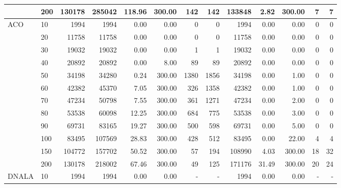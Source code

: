 \documentclass[12pt]{article}
\begin{document}
\begin{table}
{\begin{tabular}{llr|rrrrr|rrrrr}
   & 200 &   130178 &   285042 & 118.96 & 300.00 &        142 &                142 &   133848 &  2.82 & 300.00 &          7 &                  7 \\
   \midrule
ACO & 10  &     1994 &     1994 &   0.00 &   0.00 &          0 &                  0 &     1994 &  0.00 &   0.00 &          0 &                  0 \\
   & 20  &    11758 &    11758 &   0.00 &   0.00 &          0 &                  0 &    11758 &  0.00 &   0.00 &          0 &                  0 \\
   & 30  &    19032 &    19032 &   0.00 &   0.00 &          1 &                  1 &    19032 &  0.00 &   0.00 &          0 &                  0 \\
   & 40  &    20892 &    20892 &   0.00 &   8.00 &         89 &                 89 &    20892 &  0.00 &   0.00 &          0 &                  0 \\
   & 50  &    34198 &    34280 &   0.24 & 300.00 &       1380 &               1856 &    34198 &  0.00 &   1.00 &          0 &                  0 \\
   & 60  &    42382 &    45370 &   7.05 & 300.00 &        326 &               1358 &    42382 &  0.00 &   1.00 &          0 &                  0 \\
   & 70  &    47234 &    50798 &   7.55 & 300.00 &        361 &               1271 &    47234 &  0.00 &   2.00 &          0 &                  0 \\
   & 80  &    53538 &    60098 &  12.25 & 300.00 &        684 &                775 &    53538 &  0.00 &   3.00 &          0 &                  0 \\
   & 90  &    69731 &    83165 &  19.27 & 300.00 &        500 &                598 &    69731 &  0.00 &   5.00 &          0 &                  0 \\
   & 100 &    83495 &   107569 &  28.83 & 300.00 &        428 &                512 &    83495 &  0.00 &  22.00 &          4 &                  4 \\
   & 150 &   104772 &   157702 &  50.52 & 300.00 &         57 &                194 &   108990 &  4.03 & 300.00 &         18 &                 32 \\
   & 200 &   130178 &   218002 &  67.46 & 300.00 &         49 &                125 &   171176 & 31.49 & 300.00 &         20 &                 24 \\
   \midrule
DNALA & 10  &     1994 &     1994 &   0.00 &   0.00 &          - &                  - &     1994 &  0.00 &   0.00 &          - &                  - \\

\end{tabular}}
\end{table}
\end{document}

